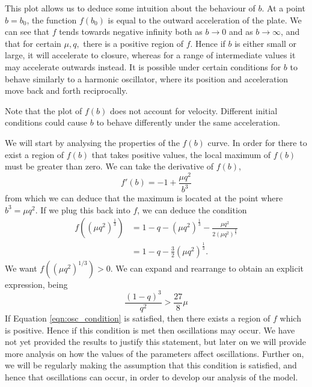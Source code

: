 This plot allows us to deduce some intuition about the behaviour of $b$.
At a point $b=b_0$, the function $f(b_0)$ is equal to the outward acceleration of the plate.
We can see that $f$ tends towards negative infinity both as $b\rightarrow 0$ and as $b\rightarrow\infty$,
and that for certain $\mu, q,$ there is a positive region of $f$.
Hence if $b$ is either small or large, it will accelerate to closure,
whereas for a range of intermediate values it may accelerate outwards instead.
It is possible under certain conditions for $b$ to behave similarly to a harmonic oscillator,
where its position and acceleration move back and forth reciprocally.

Note that the plot of $f(b)$ does not account for velocity.
Different initial conditions could cause $b$ to behave differently under the same acceleration.

We will start by analysing the properties of the $f(b)$ curve.
In order for there to exist a region of $f(b)$ that takes positive values,
the local maximum of $f(b)$ must be greater than zero.
We can take the derivative of $f(b)$,
\begin{equation}
    f'(b) = -1 + \frac{\mu q^2}{b^3}
\end{equation}
from which we can deduce that the maximum is located at the point where $b^3 = \mu q^2$.
If we plug this back into $f$, we can deduce the condition
\begin{align}
    f((\mu q^2)^{\frac{1}{3}}) & = 1 - q - (\mu q^2)^{\frac{1}{3}} - \frac{\mu q^2}{2(\mu q^2)^{\frac{2}{3}}} \\
                               & = 1 - q - \frac{3}{2}(\mu q^2)^{\frac{1}{3}}.
\end{align}
We want \(f((\mu q^2)^{1/3}) > 0 \). We can expand and rearrange to obtain an explicit expression, being
\begin{equation}
    \frac{(1-q)^3}{q^2} > \frac{27}{8}\mu
    \label{eqn:osc_condition}
\end{equation}
If Equation \ref{eqn:osc_condition} is satisfied,
then there exists a region of $f$ which is positive.
Hence if this condition is met then oscillations may occur. %
We have not yet provided the results to justify this statement, but later on we will provide more analysis on how the values of the parameters affect oscillations.
Further on, we will be regularly making the assumption that this condition is satisfied,
and hence that oscillations can occur,
in order to develop our analysis of the model.

